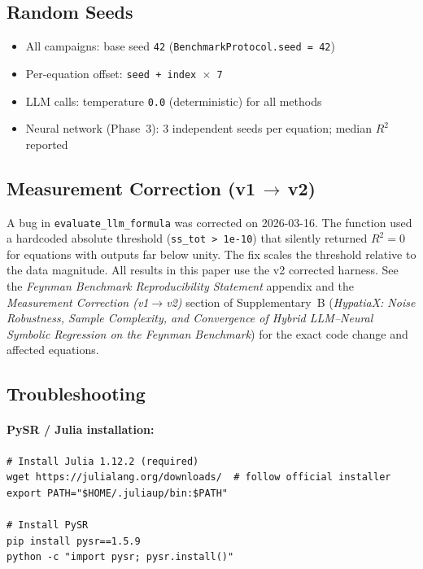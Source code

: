 \documentclass[twoside,11pt]{article}
\begin{document}
\subsection{Random Seeds}

\begin{itemize}
\item All campaigns: base seed \texttt{42} (\texttt{BenchmarkProtocol.seed = 42})
\item Per-equation offset: \texttt{seed + index $\times$ 7}
\item LLM calls: temperature \texttt{0.0} (deterministic) for all methods
\item Neural network (Phase~3): 3 independent seeds per equation; median $R^2$ reported
\end{itemize}

\subsection{Measurement Correction (v1\,$\to$\,v2)}

A bug in \texttt{evaluate\_llm\_formula} was corrected on 2026-03-16.
The function used a hardcoded absolute threshold (\texttt{ss\_tot > 1e-10})
that silently returned $R^2=0$ for equations with outputs far below unity.
The fix scales the threshold relative to the data magnitude.
All results in this paper use the v2 corrected harness.
See the \emph{Feynman Benchmark Reproducibility Statement} appendix and the
\emph{Measurement Correction (v1$\to$v2)} section of Supplementary~B
(\emph{HypatiaX: Noise Robustness, Sample Complexity, and Convergence of
Hybrid LLM--Neural Symbolic Regression on the Feynman Benchmark}) for the
exact code change and affected equations.

\subsection{Troubleshooting}

\paragraph{PySR / Julia installation:}
\begin{small}
\begin{verbatim}
# Install Julia 1.12.2 (required)
wget https://julialang.org/downloads/  # follow official installer
export PATH="$HOME/.juliaup/bin:$PATH"

# Install PySR
pip install pysr==1.5.9
python -c "import pysr; pysr.install()"
\end{verbatim}
\end{small}
\end{document}
